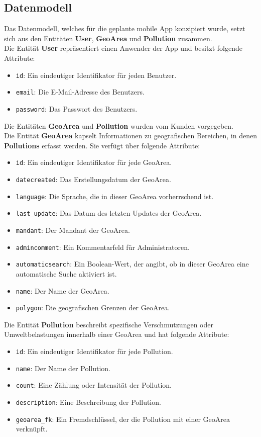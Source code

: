 \documentclass[a4paper,12pt]{article}
\begin{document}
\subsection{Datenmodell}
Das Datenmodell, welches für die geplante mobile App konzipiert wurde, setzt sich aus den Entitäten \textbf{User}, \textbf{GeoArea} und \textbf{Pollution} zusammen.\\
Die Entität \textbf{User} repräsentiert einen Anwender der App und besitzt folgende Attribute:
\begin{itemize}
    \item \texttt{id}: Ein eindeutiger Identifikator für jeden Benutzer.
    \item \texttt{email}: Die E-Mail-Adresse des Benutzers.
    \item \texttt{password}: Das Passwort des Benutzers.
\end{itemize}
Die Entitäten \textbf{GeoArea} und \textbf{Pollution} wurden vom Kunden vorgegeben.\\
Die Entität \textbf{GeoArea} kapselt Informationen zu geografischen Bereichen, in denen \textbf{Pollutions} erfasst werden. Sie verfügt über folgende Attribute:
\begin{itemize}
    \item \texttt{id}: Ein eindeutiger Identifikator für jede GeoArea.
    \item \texttt{datecreated}: Das Erstellungsdatum der GeoArea.
    \item \texttt{language}: Die Sprache, die in dieser GeoArea vorherrschend ist.
    \item \texttt{last\_update}: Das Datum des letzten Updates der GeoArea.
    \item \texttt{mandant}: Der Mandant der GeoArea.
    \item \texttt{admincomment}: Ein Kommentarfeld für Administratoren.
    \item \texttt{automaticsearch}: Ein Boolean-Wert, der angibt, ob in dieser GeoArea eine automatische Suche aktiviert ist.
    \item \texttt{name}: Der Name der GeoArea.
    \item \texttt{polygon}: Die geografischen Grenzen der GeoArea.
\end{itemize}
Die Entität \textbf{Pollution} beschreibt spezifische Verschmutzungen oder Umweltbelastungen innerhalb einer GeoArea und hat folgende Attribute:
\begin{itemize}
    \item \texttt{id}: Ein eindeutiger Identifikator für jede Pollution.
    \item \texttt{name}: Der Name der Pollution.
    \item \texttt{count}: Eine Zählung oder Intensität der Pollution.
    \item \texttt{description}: Eine Beschreibung der Pollution.
    \item \texttt{geoarea\_fk}: Ein Fremdschlüssel, der die Pollution mit einer GeoArea verknüpft.
\end{itemize}
\end{document}
